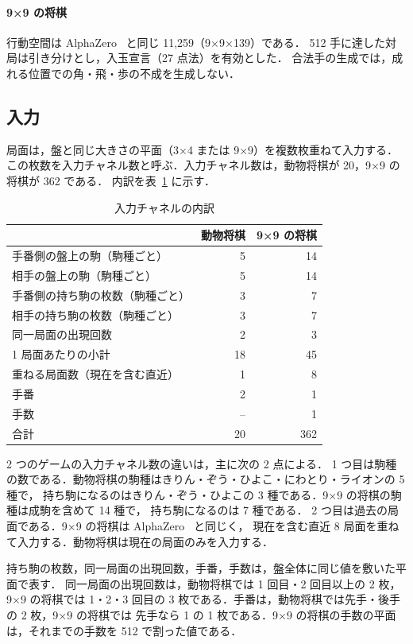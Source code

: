 \documentclass[a4paper,10pt,twocolumn]{ltjsarticle}
\begin{document}
\paragraph{9×9 の将棋}
行動空間は AlphaZero~\cite{alphazero} と同じ 11,259（9×9×139）である．
512 手に達した対局は引き分けとし，入玉宣言（27 点法）を有効とした．
合法手の生成では，成れる位置での角・飛・歩の不成を生成しない．

\subsection{入力}
局面は，盤と同じ大きさの平面（3×4 または 9×9）を複数枚重ねて入力する．
この枚数を入力チャネル数と呼ぶ．入力チャネル数は，動物将棋が 20，9×9 の将棋が 362 である．
内訳を表~\ref{tab:input} に示す．

\begin{table}[htbp]
  \centering\footnotesize
  \caption{入力チャネルの内訳}
  \label{tab:input}
  \begin{tabular}{lrr}
    \toprule
    & 動物将棋 & 9×9 の将棋 \\
    \midrule
    手番側の盤上の駒（駒種ごと） & 5 & 14 \\
    相手の盤上の駒（駒種ごと） & 5 & 14 \\
    手番側の持ち駒の枚数（駒種ごと） & 3 & 7 \\
    相手の持ち駒の枚数（駒種ごと） & 3 & 7 \\
    同一局面の出現回数 & 2 & 3 \\
    \midrule
    1 局面あたりの小計 & 18 & 45 \\
    重ねる局面数（現在を含む直近） & 1 & 8 \\
    \midrule
    手番 & 2 & 1 \\
    手数 & -- & 1 \\
    \midrule
    合計 & 20 & 362 \\
    \bottomrule
  \end{tabular}
\end{table}

2 つのゲームの入力チャネル数の違いは，主に次の 2 点による．
1 つ目は駒種の数である．動物将棋の駒種はきりん・ぞう・ひよこ・にわとり・ライオンの 5 種で，
持ち駒になるのはきりん・ぞう・ひよこの 3 種である．9×9 の将棋の駒種は成駒を含めて 14 種で，
持ち駒になるのは 7 種である．
2 つ目は過去の局面である．9×9 の将棋は AlphaZero~\cite{alphazero} と同じく，
現在を含む直近 8 局面を重ねて入力する．動物将棋は現在の局面のみを入力する．

持ち駒の枚数，同一局面の出現回数，手番，手数は，盤全体に同じ値を敷いた平面で表す．
同一局面の出現回数は，動物将棋では 1 回目・2 回目以上の 2 枚，9×9 の将棋では
1・2・3 回目の 3 枚である．手番は，動物将棋では先手・後手の 2 枚，9×9 の将棋では
先手なら 1 の 1 枚である．9×9 の将棋の手数の平面は，それまでの手数を 512 で割った値である．
\end{document}
